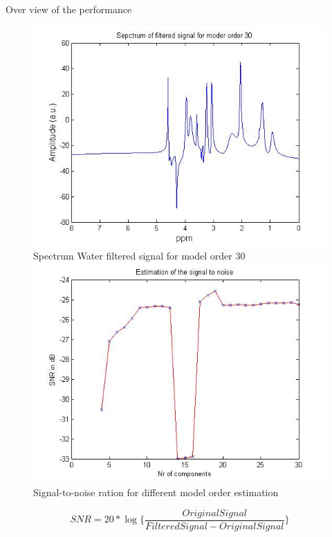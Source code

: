 \documentclass[t,12pt,english
\ifx\beamermode\undefined\else,\beamermode\fi
]{beamer}
\begin{document}
\begin{frame}{Over view of the performance}

\begin{figure}[!htbp]
%
\centering
\includegraphics[width=1\textwidth]{8_1.jpg}\\
\tiny{Spectrum Water filtered signal for model order 30}\label{fig2}
\endminipage\hfill
{}%
\centering
\includegraphics[width=1\textwidth]{11.jpg}\\
\tiny{Signal-to-noise ration for different model order estimation}\\
\endminipage\hfill
\end{figure}

\begin{equation}
SNR=20*\log\bigg\{\frac{OriginalSignal}{FilteredSignal-OriginalSignal}\bigg\}
\end{equation} 

\end{frame}
\end{document}
